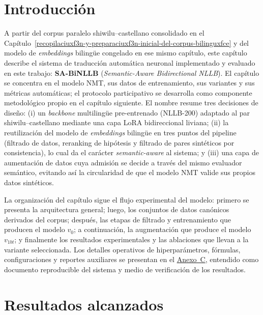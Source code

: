 \documentclass[12pt,a4paper,oneside]{book}
\begin{document}
\section{Introducción}\label{nmt-introduccion}

A partir del corpus paralelo shiwilu--castellano consolidado en el Capítulo~\ref{recopilaciuxf3n-y-preparaciuxf3n-inicial-del-corpus-bilinguxfce} y del modelo de \emph{embeddings} bilingüe congelado en ese mismo capítulo, este capítulo describe el sistema de traducción automática neuronal implementado y evaluado en este trabajo: \textbf{SA-BiNLLB} (\emph{Semantic-Aware Bidirectional NLLB}). El capítulo se concentra en el modelo NMT, sus datos de entrenamiento, sus variantes y sus métricas automáticas; el protocolo participativo se desarrolla como componente metodológico propio en el capítulo siguiente. El nombre resume tres decisiones de diseño: (i) un \emph{backbone} multilingüe pre-entrenado (NLLB-200) adaptado al par shiwilu--castellano mediante una capa LoRA bidireccional liviana; (ii) la reutilización del modelo de \emph{embeddings} bilingüe en tres puntos del pipeline (filtrado de datos, reranking de hipótesis y filtrado de pares sintéticos por consistencia), lo cual da el carácter \emph{semantic-aware} al sistema; y (iii) una capa de aumentación de datos cuya admisión se decide a través del mismo evaluador semántico, evitando así la circularidad de que el modelo NMT valide sus propios datos sintéticos.

La organización del capítulo sigue el flujo experimental del modelo: primero se presenta la arquitectura general; luego, los conjuntos de datos canónicos derivados del corpus; después, las etapas de filtrado y entrenamiento que producen el modelo \(v_0\); a continuación, la augmentación que produce el modelo \(v_{1bt}\); y finalmente los resultados experimentales y las ablaciones que llevan a la variante seleccionada. Los detalles operativos de hiperparámetros, fórmulas, configuraciones y reportes auxiliares se presentan en el \hyperref[anexo-nmt-reproducible]{Anexo~C}, entendido como documento reproducible del sistema y medio de verificación de los resultados.

\section{Resultados alcanzados}\label{nmt-resultados-alcanzados}
\end{document}
